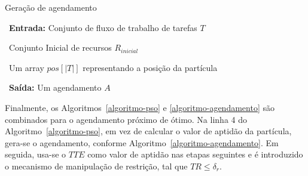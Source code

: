 \begin{algorithm}
	\caption{Geração de agendamento}
	\ {\textbf{Entrada:} Conjunto de fluxo de trabalho de tarefas $ T $}
	
	\ {Conjunto Inicial de recursos $ R_{inicial} $}
	
	\ {Um array  $pos[{\left| T \right|}]$ representando a posição da partícula}
	
	\ {\textbf{Saída:} Um agendamento $ A $}
	
	\begin{algorithmic}[1]
		
		 
		\Else
		\State {$ TIni_{t_i} = (\max {\{TFin_{t_{pai}}:t_{pai}[ \in pais(t_i) \}},TFin_{r_{pos[i]}}) $}	
		\EndIf
		\EndIf	
		\EndFor
		\EndIf
		\EndFor 
	\end{algorithmic}
	\label{algoritmo-agendamento}
\end{algorithm}
Finalmente, os Algoritmos~\ref{algoritmo-pso} e \ref{algoritmo-agendamento} são combinados para o agendamento próximo de ótimo. Na linha 4 do Algoritmo~\ref{algoritmo-pso}, em vez de calcular o valor de aptidão da partícula, gera-se o agendamento, conforme Algoritmo~\ref{algoritmo-agendamento}. Em seguida, usa-se o $ TTE $ como valor de aptidão nas etapas seguintes e é introduzido o mecanismo de manipulação de restrição, tal que  ${TR \le {\delta _r}} $.  